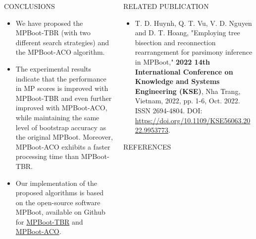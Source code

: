 \documentclass[%
  final,%
  english,%
]{beamer}
\begin{document}
\begin{frame}[t, fragile = singleslide]
\begin{columns}[t, onlytextwidth]
%
\begin{column}{0.49\textwidth}
%
\begin{block}{CONCLUSIONS}
\vspace{0.5cm}
\begin{itemize}
\item We have proposed the MPBoot-TBR (with two different search strategies) and the MPBoot-ACO algorithm.
\item The experimental results indicate that the performance in MP scores is improved with MPBoot-TBR and even further improved with MPBoot-ACO, while maintaining the same level of bootstrap accuracy as the original MPBoot. Moreover, MPBoot-ACO exhibits a faster processing time than MPBoot-TBR.
\item Our implementation of the proposed algorithms is based on the open-source software MPBoot, available on Github for \href{https://github.com/HynDuf/mpboot/tree/Huynh_Tien_Dung}{MPBoot-TBR} and \href{https://github.com/HynDuf/mpboot/tree/ant-colony-optimization}{MPBoot-ACO}.
\end{itemize}
\end{block}
\end{column}
%
\begin{column}{0.49\textwidth}
%
\begin{block}{RELATED PUBLICATION}
\vspace{0.5cm}
\begin{itemize}
    \item \footnotesize{T. D. Huynh, Q. T. Vu, V. D. Nguyen and D. T. Hoang, "Employing tree bisection and reconnection rearrangement for parsimony inference in MPBoot," \textbf{2022 14th International Conference on Knowledge and Systems Engineering (KSE)}, Nha Trang, Vietnam, 2022, pp. 1-6, Oct. 2022. ISSN 2694-4804. DOI: \url{https://doi.org/10.1109/KSE56063.2022.9953773}.}
\end{itemize}
\end{block}
\begin{block}{REFERENCES}
\vspace{0.5cm}
\printbibliography[heading = none]
\end{block}
%
\end{column}
%
\end{columns}


\\
\\

\vspace*{\baselineskip}

\end{frame}

\end{document}
